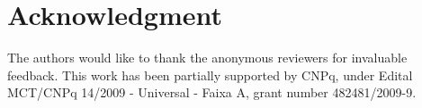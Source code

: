 \documentclass[conference]{IEEEtran}
\begin{document}
	 	
	
\section*{Acknowledgment}
The authors would like to thank the anonymous reviewers for invaluable
feedback. This work has been partially supported by CNPq, under Edital
MCT/CNPq 14/2009 - Universal - Faixa A, grant number 482481/2009-9.










\end{document}
